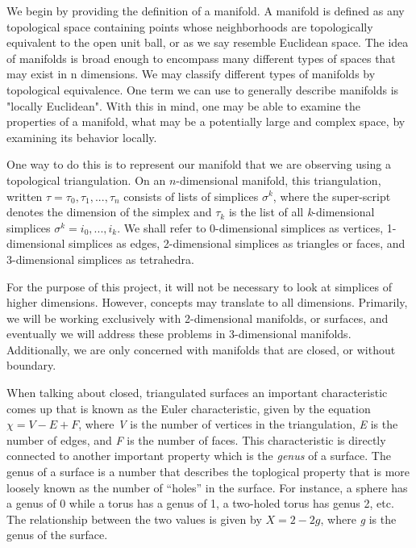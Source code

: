 \documentclass[12pt]{article}
\begin{document}
We begin by providing the definition of a manifold. A manifold is defined as any topological space containing points whose neighborhoods are topologically equivalent to the open unit ball, or as we say resemble Euclidean space. The idea of manifolds is broad enough to encompass many different types of spaces that may exist in n dimensions. We may classify different types of manifolds by topological equivalence. One term we can use to generally describe manifolds is "locally Euclidean". With this in mind, one may be able to examine the properties of a manifold, what may be a potentially large and complex space, by examining its behavior locally.\newline

\noindent One way to do this is to represent our manifold that we are observing using a topological triangulation. On an $n$-dimensional manifold, this triangulation, written $\tau = {\tau_0, \tau_1, ... , \tau_n}$ consists of lists of simplices $\sigma^k$, where the super-script denotes the dimension of the simplex and $\tau_k$ is the list of all \textit{k}-dimensional simplices $\sigma^k = {i_0, ... , i_k}$. We shall refer to 0-dimensional simplices as vertices, 1-dimensional simplices as edges, 2-dimensional simplices as triangles or faces, and 3-dimensional simplices as tetrahedra.\newline

\noindent For the purpose of this project, it will not be necessary to look at simplices of higher dimensions. However, concepts may translate to all dimensions. Primarily, we will be working exclusively with 2-dimensional manifolds, or surfaces, and eventually we will address these problems in 3-dimensional manifolds. Additionally, we are only concerned with manifolds that are closed, or without boundary. \newline

\noindent When talking about closed, triangulated surfaces an important characteristic comes up that is known as the Euler characteristic, given by the equation $\chi = V - E + F$, where \textit{V} is the number of vertices in the triangulation, \textit{E} is the number of edges, and \textit{F} is the number of faces. This characteristic is directly connected to another important property which is the \textit{genus} of a surface. The genus of a surface is a number that describes the toplogical property that is more loosely known as the number of ``holes'' in the surface. For instance, a sphere has a genus of 0 while a torus has a genus of 1, a two-holed torus has genus 2, etc. The relationship between the two values is given by $X = 2 - 2g$, where \textit{g} is the genus of the surface.\newline 
\end{document}
